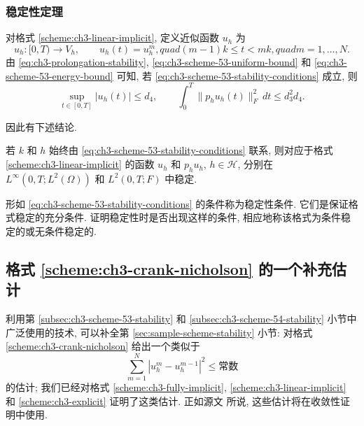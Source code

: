 \subsubsection{稳定性定理}
\label{subsubsec:ch3-scheme-53-stability-theorem}

对格式 \ref{scheme:ch3-linear-implicit}, 定义近似函数 $u_h$ 为
\begin{equation}
u_h:[0,T)\longrightarrow V_h,
\qquad
u_h(t)=u_h^m,quad (m-1)k\leq t<mk,quad m=1,\ldots,N.
\label{eq:ch3-scheme-53-time-reconstruction}
\end{equation}
由 \eqref{eq:ch3-prolongation-stability}, \eqref{eq:ch3-scheme-53-uniform-bound} 和 \eqref{eq:ch3-scheme-53-energy-bound} 可知, 若 \eqref{eq:ch3-scheme-53-stability-conditions} 成立, 则
\[
\sup_{t\in[0,T]}|u_h(t)|\leq d_4,
\qquad
\int_0^T\lVert p_hu_h(t)\rVert_F^2\,dt\leq d_3^2d_4.
\]

\hypertarget{chapter-03-page-248}{}
因此有下述结论.

\begin{Theorem}
\label{thm:ch3-scheme-53-stability}
若 $k$ 和 $h$ 始终由 \eqref{eq:ch3-scheme-53-stability-conditions} 联系, 则对应于格式 \ref{scheme:ch3-linear-implicit} 的函数 $u_h$ 和 $p_hu_h$, $h\in\mathcal H$, 分别在 $L^\infty(0,T;L^2(\Omega))$ 和 $L^2(0,T;F)$ 中稳定.
\end{Theorem}

\begin{Definition}
\label{def:ch3-stability-condition}
形如 \eqref{eq:ch3-scheme-53-stability-conditions} 的条件称为稳定性条件. 它们是保证格式稳定的充分条件. 证明稳定性时是否出现这样的条件, 相应地称该格式为条件稳定的或无条件稳定的.
\end{Definition}

\MBSchemeFiftyFourBlock

\hypertarget{chapter-03-page-251}{}
\subsection{格式 \ref{scheme:ch3-crank-nicholson} 的一个补充估计}
\label{subsec:ch3-scheme-52-complementary-estimate}

利用第 \ref{subsec:ch3-scheme-53-stability} 和 \ref{subsec:ch3-scheme-54-stability} 小节中广泛使用的技术, 可以补全第 \ref{sec:sample-scheme-stability} 小节: 对格式 \ref{scheme:ch3-crank-nicholson} 给出一个类似于
\begin{equation}
\sum_{m=1}^N|u_h^m-u_h^{m-1}|^2\leq\text{常数}
\label{eq:ch3-scheme-52-target-increment-estimate}
\end{equation}
的估计; 我们已经对格式 \ref{scheme:ch3-fully-implicit}, \ref{scheme:ch3-linear-implicit} 和 \ref{scheme:ch3-explicit} 证明了这类估计. 正如源文  所说, 这些估计将在收敛性证明中使用.

